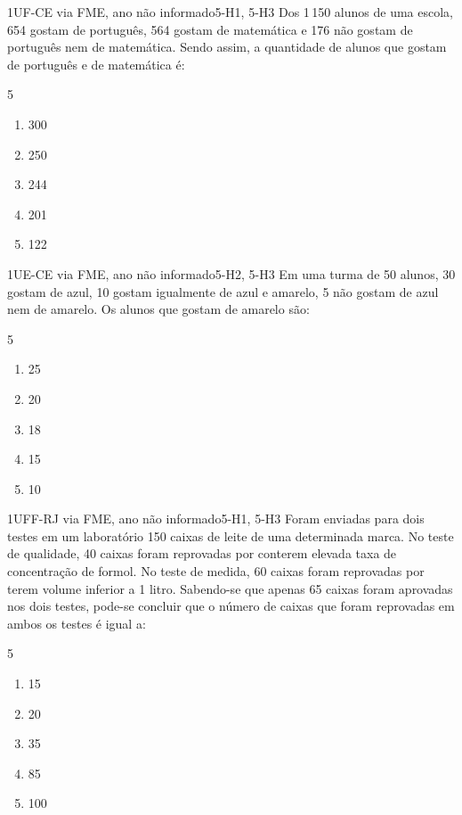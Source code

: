 \begin{questao}{1}{UF-CE via FME, ano não informado}{5-H1, 5-H3}\label{u5:ufce13}
Dos 1\,150 alunos de uma escola, 654 gostam de português, 564 gostam de matemática e 176 não gostam de português nem de matemática. Sendo assim, a quantidade de alunos que gostam de português e de matemática é:
\begin{multicols}{5}
\begin{enumerate}[label=\alph*)]
  \item 300
  \item 250
  \item 244
  \item 201
  \item 122
\end{enumerate}
\end{multicols}
\end{questao}

\begin{questao}{1}{UE-CE via FME, ano não informado}{5-H2, 5-H3}\label{u5:uece14}
Em uma turma de 50 alunos, 30 gostam de azul, 10 gostam igualmente de azul e amarelo, 5 não gostam de azul nem de amarelo. Os alunos que gostam de amarelo são:
\begin{multicols}{5}
\begin{enumerate}[label=\alph*)]
  \item 25
  \item 20
  \item 18
  \item 15
  \item 10
\end{enumerate}
\end{multicols}
\end{questao}

\begin{questao}{1}{UFF-RJ via FME, ano não informado}{5-H1, 5-H3}\label{u5:uff9}
Foram enviadas para dois testes em um laboratório 150 caixas de leite de uma determinada marca. No teste de qualidade, 40 caixas foram reprovadas por conterem elevada taxa de concentração de formol. No teste de medida, 60 caixas foram reprovadas por terem volume inferior a 1 litro. Sabendo-se que apenas 65 caixas foram aprovadas nos dois testes, pode-se concluir que o número de caixas que foram reprovadas em ambos os testes é igual a:
\begin{multicols}{5}
\begin{enumerate}[label=\alph*)]
  \item 15
  \item 20
  \item 35
  \item 85
  \item 100
\end{enumerate}
\end{multicols}
\end{questao}

